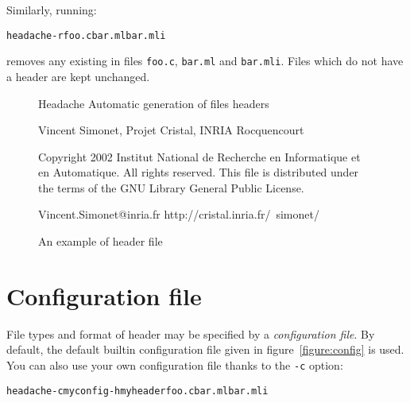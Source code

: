 \documentclass{article}
\begin{document}
Similarly, running:
\begin{alltt}
  headache -r foo.c bar.ml bar.mli
\end{alltt}
removes any existing in files \verb+foo.c+, \verb+bar.ml+ and
\verb+bar.mli+.  Files which do not have a header are kept unchanged.

\begin{figure}
\begin{center}
\begin{boxedverbatim}
                             Headache
               Automatic generation of files headers

        Vincent Simonet, Projet Cristal, INRIA Rocquencourt

Copyright 2002 
Institut National de Recherche en Informatique et en Automatique.
All rights reserved.  This file is distributed under the terms of
the GNU Library General Public License.

Vincent.Simonet@inria.fr           http://cristal.inria.fr/~simonet/
\end{boxedverbatim}
\end{center}
  \caption{An example of header file}
  \label{figure:header}
\end{figure}



\section{Configuration file}

File types and format of header may be specified by a
\emph{configuration file}.  By default, the default builtin
configuration file given in figure~\ref{figure:config} is used.  You
can also use your own configuration file thanks to the \verb+-c+
option:
\begin{alltt}
  headache -c myconfig -h myheader foo.c bar.ml bar.mli
\end{alltt}
\end{document}
